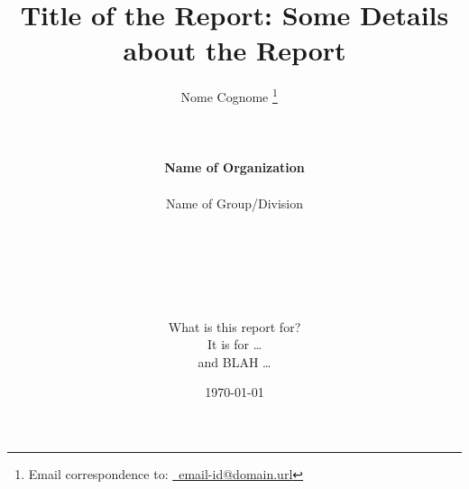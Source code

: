 \documentclass[letterpaper,12pt]{report}
\begin{document}










%
%
\title{\Huge \bf Title of the Report: Some Details about the Report}

\date{\today}

\author{{\LARGE Nome Cognome}
\thanks{Email correspondence to: \href{mailto:email-id@domain.url}{\Email\ email-id@domain.url}}
\ \\
\vspace{-4.0in}
\ \\
\ \\
\ \\
{\bf \LARGE
	Name of Organization
	\vspace{0.1cm}} \\
\hline
\ \\
{\Large \sc Name of Group/Division} \\
\ \\
\ \\
\ \\
\ \\
\ \\
\vspace{2.0in}
\ \\
{\large \sc What is this report for?} \\
{\large It is for \dots} \\
{\large and BLAH \dots}
}

\maketitle


%
\end{document}
